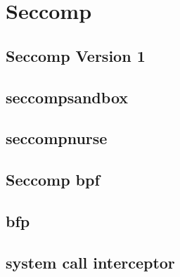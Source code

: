 \chapter{Seccomp}
\label{Seccomp}

\section{Seccomp Version 1} 
\section{seccompsandbox}
\section{seccompnurse}

\section{Seccomp bpf}
\section{bfp}
\section{system call interceptor}
